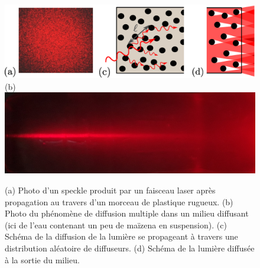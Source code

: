 \documentclass[a4paper,11pt]{article} %
\begin{document}
	\begin{figure}[h]
		\centering
		\begin{minipage}[c]{0.85\linewidth}
			\centering
			\includegraphics[width=0.85\linewidth]{./Illustrations/figure_scatt.eps} \\
			(b) \hspace{0.1cm} \includegraphics[width=0.8\linewidth]{./Illustrations/Photo_diff_desordre_3D}
			\caption{(a) Photo d'un speckle produit par un faisceau laser après propagation au travers d'un morceau de plastique rugueux. (b) Photo du phénomène de diffusion multiple dans un milieu diffusant (ici de l'eau contenant un peu de maïzena en suspension). (c) Schéma de la diffusion de la lumière se propageant à travers une distribution aléatoire de diffuseurs. (d) Schéma de la lumière diffusée à la sortie du milieu.}
			\label{fig:diffusion_desordre_3D}
		\end{minipage}
	\end{figure}
\end{document}
